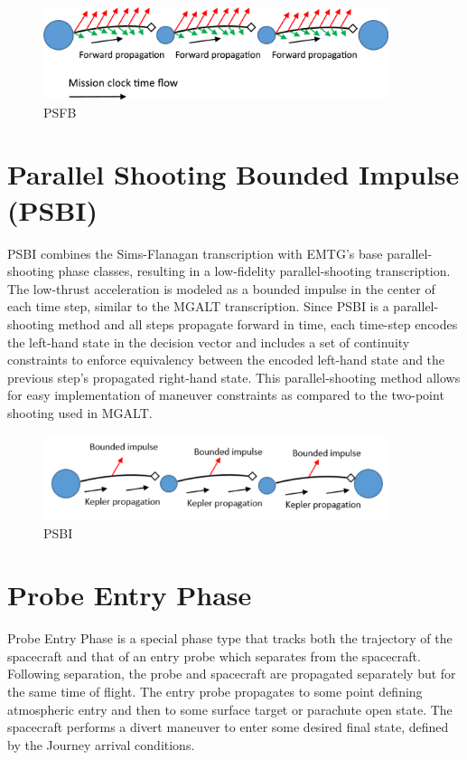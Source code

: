 \begin{figure}[H]
    \centering
    \includegraphics[width=0.9\textwidth]{../../shared_latex_inputs/images/PSFB_with_perturbations.png}
    \caption{\acf{PSFB}}
\end{figure}


\section{Parallel Shooting Bounded Impulse (PSBI)}
\label{sec:parallel_shooting_bounded_impulse}
\ac{PSBI} combines the Sims-Flanagan transcription with \ac{EMTG}'s base parallel-shooting phase classes, resulting in a low-fidelity parallel-shooting transcription. The low-thrust acceleration is modeled as a bounded impulse in the center of each time step, similar to the \ac{MGALT} transcription. Since \ac{PSBI} is a parallel-shooting method and all steps propagate forward in time, each time-step encodes the left-hand state in the decision vector and includes a set of continuity constraints to enforce equivalency between the encoded left-hand state and the previous step's propagated right-hand state. This parallel-shooting method allows for easy implementation of maneuver constraints as compared to the two-point shooting used in \ac{MGALT}. 

\begin{figure}[H]
    \centering
    \includegraphics[width=0.9\textwidth]{../../shared_latex_inputs/images/PSBI.png}
    \caption{\acf{PSBI}}
\end{figure}



\section{Probe Entry Phase}
\label{sec:probe_entry}
Probe Entry Phase is a special phase type that tracks both the trajectory of the spacecraft and that of an entry probe which separates from the spacecraft. Following separation, the probe and spacecraft are propagated separately but for the same time of flight. The entry probe propagates to some point defining atmospheric entry and then to some surface target or parachute open state. The spacecraft performs a divert maneuver to enter some desired final state, defined by the Journey arrival conditions. 


